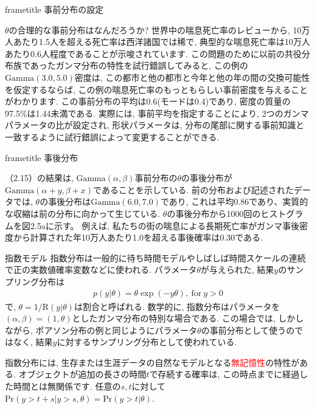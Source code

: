 \documentclass[10pt,dvipdfmx,a4]{beamer}
\newcommand{\eqn}[1]{\begin{align*}#1\end{align*}}
\newcommand{\dbox}[1]{\begin{beamercolorbox}[wd=122mm, sep=0pt, shadow=false, rounded=false]{frametitle} { #1}\end{beamercolorbox}}
\newcommand{\tcr}[1]{\textcolor{red}{#1}}
\begin{document}

\begin{frame}
\dbox{事前分布の設定}
$\theta$の合理的な事前分布はなんだろうか?
世界中の喘息死亡率のレビューから, 10万人あたり1.5人を超える死亡率は西洋諸国では稀で, 典型的な喘息死亡率は10万人あたり0.6人程度であることが示唆されています.
この問題のために以前の共役分布族であったガンマ分布の特性を試行錯誤してみると, この例の$\text{Gamma}(3.0,5.0)$密度は, この都市と他の都市と今年と他の年の間の交換可能性を仮定するならば, この例の喘息死亡率のもっともらしい事前密度を与えることがわかります.
この事前分布の平均は0.6(モードは0.4)であり, 密度の質量の97.5\%は1.44未満である.
実際には, 事前平均を指定することにより, 2つのガンマパラメータの比が設定され, 形状パラメータは, 分布の尾部に関する事前知識と一致するように試行錯誤によって変更することができる.
\end{frame}


\begin{frame}
\dbox{事後分布}
（2.15）の結果は, $\text{Gamma}(\alpha,\beta)$事前分布の$\theta$の事後分布が$\text{Gamma}(\alpha+y,\beta+x)$であることを示している.
前の分布および記述されたデータでは, $\theta$の事後分布は$\text{Gamma}(6.0,7.0)$であり, これは平均0.86であり、実質的な収縮は前の分布に向かって生じている.
$\theta$の事後分布から1000回のヒストグラムを図2.5aに示す。
例えば, 私たちの街の喘息による長期死亡率がガンマ事後密度から計算された年10万人あたり1.0を超える事後確率は0.30である.
\end{frame}


\begin{frame}{指数モデル}
指数分布は一般的に待ち時間モデルやしばしば時間スケールの連続で正の実数値確率変数などに使われる.
パラメータ$\theta$が与えられた, 結果$y$のサンプリング分布は
\eqn{p(y|\theta)=\theta\exp(-y\theta),\ \text{for}\ y>0}
で, $\theta=1/\text{R}(y|\theta)$は割合と呼ばれる.
数学的に, 指数分布はパラメータを$(\alpha,\beta)=(1,\theta)$としたガンマ分布の特別な場合である.
この場合では, しかしながら, ポアソン分布の例と同じようにパラメータ$\theta$の事前分布として使うのではなく, 結果$y$に対するサンプリング分布として使われている.

指数分布には, 生存または生涯データの自然なモデルとなる\tcr{無記憶性}の特性がある.
オブジェクトが追加の長さの時間$t$で存続する確率は, この時点までに経過した時間とは無関係です.
任意の$s, t$に対して$\text{Pr}(y>t+s|y>s,\theta)=\text{Pr}(y>t|\theta)$.
\end{frame}
\end{document}
